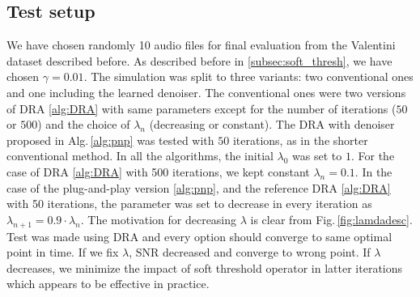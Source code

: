 \documentclass[conference]{IEEEtran}
\newcommand{\todo}[1]{\textcolor{red}{#1}}
\begin{document}
\subsection{Test setup}
We have chosen randomly 10 audio files for final evaluation from the Valentini dataset \cite{ValentiniBotinhao2017} described before.
As described before in \ref{subsec:soft_thresh}, we have chosen $\gamma = 0.01$.
The simulation was split to three variants: two conventional ones and one including the learned denoiser.
The conventional ones were two versions of DRA \ref{alg:DRA} with same parameters except for the number of iterations ($50$ or $500$) and the choice of $\lambda_n$ (decreasing or constant).
The DRA with denoiser proposed in Alg.\,\ref{alg:pnp} was tested with $50$ iterations,
as in the shorter conventional method.
In all the algorithms, the initial $\lambda_0$ was set to $1$. %
For the case of DRA \ref{alg:DRA} with 500 iterations, we kept constant $\lambda_n = 0.1$.
In the case of the plug-and-play version \ref{alg:pnp}, and the reference DRA \ref{alg:DRA} with 50 iterations, the parameter was set to decrease in every iteration as $\lambda_{n+1} = 0.9\cdot\lambda_n$.
The motivation for decreasing $\lambda$ is clear from Fig.\,\ref{fig:lamdadesc}.
Test was made using DRA and every option should converge to same optimal point in time.
If we fix $\lambda$, SNR decreased and converge to wrong point.
If $\lambda$ decreases, we minimize the impact of soft threshold operator in latter iterations which appears to be effective in practice.
\end{document}
